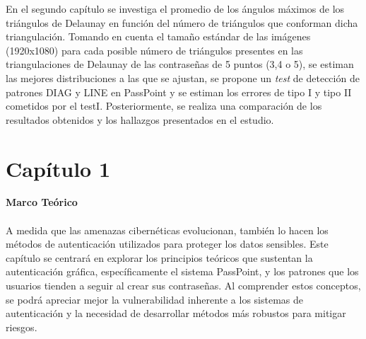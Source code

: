 \documentclass[12pt]{report}
\begin{document}
	En el segundo capítulo se investiga el promedio de los ángulos máximos de los triángulos de Delaunay en función del número de triángulos que conforman dicha triangulación. Tomando en cuenta el tamaño estándar de las imágenes (1920x1080) para cada posible número de triángulos presentes en las triangulaciones de Delaunay de las contraseñas de 5 puntos (3,4 o 5), se estiman las  mejores distribuciones a las que se ajustan, se propone un \textit{test} de detección de patrones DIAG y LINE en PassPoint y se estiman los errores de tipo I y tipo II cometidos por el testI. Posteriormente, se realiza una comparación de los resultados obtenidos y los hallazgos presentados en el estudio\cite{13}.
	
	
	
	
	

\setcounter{chapter}{1}

\chapter*{\LARGE{Capítulo 1}}
\vspace{-2em} %
\noindent\textbf{\LARGE Marco Teórico}\\
\vspace{2em}
\\
 A medida que las amenazas cibernéticas evolucionan, también lo hacen los métodos de autenticación utilizados para proteger los datos sensibles. Este capítulo se centrará en explorar los principios teóricos que sustentan la autenticación gráfica, específicamente el sistema PassPoint, y los patrones que los usuarios tienden a seguir al crear sus contraseñas. Al comprender estos conceptos, se podrá apreciar mejor la vulnerabilidad inherente a los sistemas de autenticación y la necesidad de desarrollar métodos más robustos para mitigar riesgos.
\end{document}
